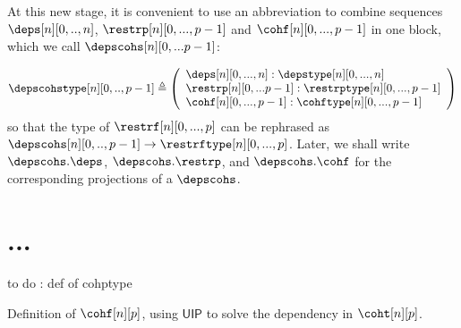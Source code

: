 \documentclass{msc}
\newcommand{\defeq}{\ensuremath{\triangleq}}
\newcommand{\UIP}{\textsf{UIP}}
\begin{document}
At this new stage, it is convenient to use an abbreviation to combine sequences $\deps[n][0,..,n]$, $\restrp[n][0,...,p-1]$ and $\cohf[n][0,...,p-1]$ in one block, which we call $\depscohs[n][0,...p-1]$:

\begin{align*}
  \depscohstype[n][0,..,p-1] \defeq
  \left(\begin{array}{l}
            \deps[n][0,...,n] :\depstype[n][0,...,n]        \\
            \restrp[n][0,...p-1]: \restrptype[n][0,...,p-1] \\
            \cohf[n][0,...,p-1]: \cohftype[n][0,...,p-1]    \\
          \end{array}\right)
\end{align*}
so that the type of $\restrf[n][0,...,p]$ can be rephrased as $\depscohs[n][0,..,p-1] \rightarrow \restrftype[n][0,...,p]$. Later, we shall write $\depscohs.\deps$, $\depscohs.\restrp$, and $\depscohs.\cohf$ for the corresponding projections of a $\depscohs$.

\section{...}

to do : def of cohptype

Definition of $\cohf[n][p]$, using $\UIP$ to solve the dependency in $\coht[n][p]$.
\end{document}
